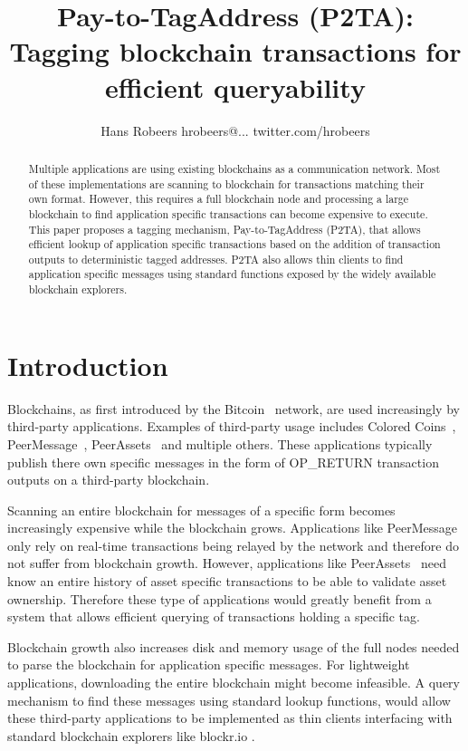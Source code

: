 \documentclass[a4paper,10pt]{article}
\title{Pay-to-TagAddress (P2TA): Tagging blockchain transactions for efficient queryability}
\author{Hans Robeers hrobeers@... twitter.com/hrobeers}
\begin{document}
\maketitle

\begin{abstract}
Multiple applications are using existing blockchains as a communication network.
Most of these implementations are scanning to blockchain for transactions matching their own format.
However, this requires a full blockchain node and processing a large blockchain to find application specific transactions can become expensive to execute.
This paper proposes a tagging mechanism, Pay-to-TagAddress (P2TA), that allows efficient lookup of application specific transactions based on the addition of transaction outputs to deterministic tagged addresses. P2TA also allows thin clients to find application specific messages using standard functions exposed by the widely available blockchain explorers.
\end{abstract}

\doclicenseThis

\section{Introduction}
Blockchains, as first introduced by the Bitcoin~\cite{Nak08} network, are used increasingly by third-party applications.
Examples of third-party usage includes Colored Coins~\cite{Ros12}, PeerMessage~\cite{Emeth}, PeerAssets~\cite{Pchem} and multiple others.
These applications typically publish there own specific messages in the form of OP\_RETURN transaction outputs on a third-party blockchain.

Scanning an entire blockchain for messages of a specific form becomes increasingly expensive while the blockchain grows.
Applications like PeerMessage~\cite{Emeth} only rely on real-time transactions being relayed by the network and therefore do not suffer from blockchain growth.
However, applications like PeerAssets~\cite{Pchem} need know an entire history of asset specific transactions to be able to validate asset ownership.
Therefore these type of applications would greatly benefit from a system that allows efficient querying of transactions holding a specific tag.

Blockchain growth also increases disk and memory usage of the full nodes needed to parse the blockchain for application specific messages. For lightweight applications, downloading the entire blockchain might become infeasible. A query mechanism to find these messages using standard lookup functions, would allow these third-party applications to be implemented as thin clients interfacing with standard blockchain explorers like blockr.io \cite{Blockr}.
\end{document}
